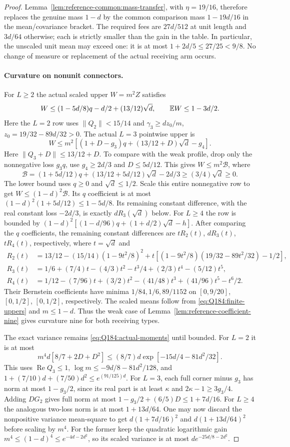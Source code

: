 \begin{proof}
Lemma~\ref{lem:reference-common:mass-transfer}, with $\eta=19/16$,
therefore replaces the genuine mass $1-d$ by the common comparison
mass $1-19d/16$ in the mean/covariance bracket. The required fees are
$27d/512$ at unit length and $3d/64$ otherwise; each is strictly
smaller than the gain in the table. In particular, the unscaled unit
mean may exceed one: it is at most $1+2d/5\le27/25<9/8$.
No change of measure or replacement of the actual receiving arm occurs.

\paragraph{Curvature on nonunit connectors.}
For $L\ge2$ the actual scaled upper $W=m^2Z$ satisfies
\[
 W\le(1-5d/8)q-d/2+(13/12)\sqrt d,\qquad
 \mathbb E W\le1-3d/2.
\]
Here the $L=2$ row uses $\|Q_2\|<15/14$ and
$\gamma_3\ge dz_0/m$, $z_0=19/32-89d/32>0$.
The actual $L=3$ pointwise upper is
\[
 W\le m^2[(1+D-g_3)q+(13/12+D)\sqrt d-g_4].
\]
Here $\|Q_3+D\|\le13/12+D$. To compare with the weak profile,
drop only the nonnegative loss $g_3q$, use $g_4\ge2d/3$ and
$D\le5d/12$. This gives $W\le m^2\mathcal B$, where
\[
 \mathcal B=(1+5d/12)q+(13/12+5d/12)\sqrt d-2d/3
       \ge(3/4)\sqrt d\ge0.
\]
The lower bound uses $q\ge0$ and $\sqrt d\le1/2$.
Scale this entire nonnegative row to get
$W\le(1-d)^2\mathcal B$. Its $q$ coefficient is at most
$(1-d)^2(1+5d/12)\le1-5d/8$.
Its remaining constant difference, with the real constant loss
$-2d/3$, is exactly $dR_3(\sqrt d)$ below.
For $L\ge4$ the row is bounded by
$(1-d)^2[(1-d/96)q+(1+d/2)\sqrt d-h]$.
After comparing the $q$ coefficients, the remaining constant differences
are $tR_2(t)$, $dR_3(t)$, $tR_4(t)$, respectively, where $t=\sqrt d$ and
\[
\begin{aligned}
 R_2(t)&=13/12-(15/14)(1-9t^2/8)^2
    +t[(1-9t^2/8)(19/32-89t^2/32)-1/2],\\
 R_3(t)&=1/6+(7/4)t-(4/3)t^2-t^3/4+(2/3)t^4-(5/12)t^5,\\
 R_4(t)&=1/12-(7/96)t+(3/2)t^2-(41/48)t^3
    +(41/96)t^5-t^6/2.
\end{aligned}
\]
Their Bernstein coefficients have minima $1/84,1/6,89/1152$
on $[0,9/20]$, $[0,1/2]$, $[0,1/2]$, respectively.
The scaled means follow from \eqref{eq:Q184:finite-uppers} and $m\le1-d$.
Thus the weak case of Lemma~\ref{lem:reference-coefficient-nine}
gives curvature nine for both receiving types.

The exact variance remains \eqref{eq:Q184:actual-moments} until bounded.
For $L=2$ it is at most
\[
 m^4d[8/7+2D+D^2]
 \le(8/7)d\exp[-15d/4-81d^2/32].
\]
This uses $\operatorname{Re}Q_3\le1$,
$\log m\le-9d/8-81d^2/128$, and
$1+(7/10)d+(7/50)d^2\le e^{(91/125)d}$.
For $L=3$, each full corner minus $g_3$ has norm at most $1-g_3/2$,
since its real part is at least $\kappa$ and
$2\kappa-1\ge3g_3/4$.
Adding $DG_2$ gives full norm at most
$1-g_3/2+(6/5)D\le1+7d/16$.
For $L\ge4$ the analogous two-loss norm is at most $1+13d/64$.
One may now discard the nonpositive variance mean-square to get
$d(1+7d/16)^2$ and $d(1+13d/64)^2$ before scaling by $m^4$.
For the former keep the quadratic logarithmic gain
$m^4\le(1-d)^4\le e^{-4d-2d^2}$, so its scaled variance is at most
$d e^{-25d/8-2d^2}$.


\end{proof}
